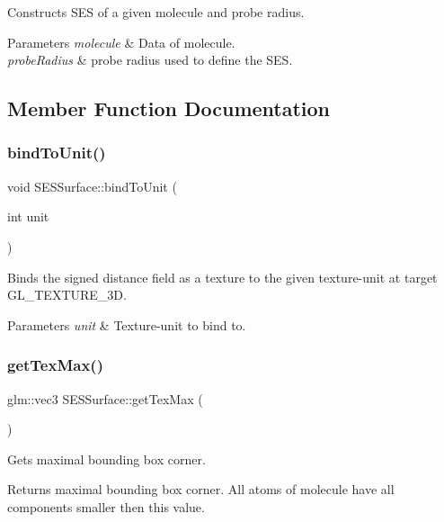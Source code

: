 Constructs S\+ES of a given molecule and probe radius.


\begin{DoxyParams}{Parameters}
{\em molecule} & Data of molecule. \\
\hline
{\em probe\+Radius} & probe radius used to define the S\+ES. \\
\hline
\end{DoxyParams}


\subsection{Member Function Documentation}
\mbox{\label{class_s_e_s_surface_af5a7ed60365486cd63a9ad09b0d7ef8a}} 
\subsubsection{\texorpdfstring{bindToUnit()}{bindToUnit()}}
{\footnotesize\ttfamily void S\+E\+S\+Surface\+::bind\+To\+Unit (\begin{DoxyParamCaption}\item[{int}]{unit }\end{DoxyParamCaption})}

Binds the signed distance field as a texture to the given texture-\/unit at target G\+L\+\_\+\+T\+E\+X\+T\+U\+R\+E\+\_\+3D.


\begin{DoxyParams}{Parameters}
{\em unit} & Texture-\/unit to bind to. \\
\hline
\end{DoxyParams}
\mbox{\label{class_s_e_s_surface_aa133f4b102219bb8de92e4eb7d8e4660}} 
\subsubsection{\texorpdfstring{getTexMax()}{getTexMax()}}
{\footnotesize\ttfamily glm\+::vec3 S\+E\+S\+Surface\+::get\+Tex\+Max (\begin{DoxyParamCaption}{ }\end{DoxyParamCaption})}

Gets maximal bounding box corner.

\begin{DoxyReturn}{Returns}
maximal bounding box corner. All atoms of molecule have all components smaller then this value. 
\end{DoxyReturn}
\mbox{\label{class_s_e_s_surface_ae287cb897484575889d57674814b9d21}} 
